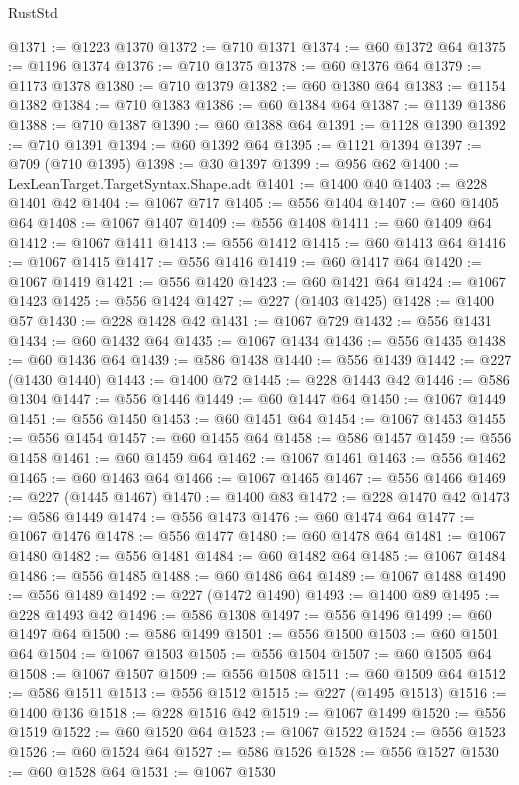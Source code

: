 \begin{lexlean}{RustStd}
\begin{coremodule}
@1371 := @1223 @1370
@1372 := @710 @1371
@1374 := @60 @1372 @64
@1375 := @1196 @1374
@1376 := @710 @1375
@1378 := @60 @1376 @64
@1379 := @1173 @1378
@1380 := @710 @1379
@1382 := @60 @1380 @64
@1383 := @1154 @1382
@1384 := @710 @1383
@1386 := @60 @1384 @64
@1387 := @1139 @1386
@1388 := @710 @1387
@1390 := @60 @1388 @64
@1391 := @1128 @1390
@1392 := @710 @1391
@1394 := @60 @1392 @64
@1395 := @1121 @1394
@1397 := @709 (@710 @1395)
@1398 := @30 @1397
@1399 := @956 @62
@1400 := LexLeanTarget.TargetSyntax.Shape.adt
@1401 := @1400 @40
@1403 := @228 @1401 @42
@1404 := @1067 @717
@1405 := @556 @1404
@1407 := @60 @1405 @64
@1408 := @1067 @1407
@1409 := @556 @1408
@1411 := @60 @1409 @64
@1412 := @1067 @1411
@1413 := @556 @1412
@1415 := @60 @1413 @64
@1416 := @1067 @1415
@1417 := @556 @1416
@1419 := @60 @1417 @64
@1420 := @1067 @1419
@1421 := @556 @1420
@1423 := @60 @1421 @64
@1424 := @1067 @1423
@1425 := @556 @1424
@1427 := @227 (@1403 @1425)
@1428 := @1400 @57
@1430 := @228 @1428 @42
@1431 := @1067 @729
@1432 := @556 @1431
@1434 := @60 @1432 @64
@1435 := @1067 @1434
@1436 := @556 @1435
@1438 := @60 @1436 @64
@1439 := @586 @1438
@1440 := @556 @1439
@1442 := @227 (@1430 @1440)
@1443 := @1400 @72
@1445 := @228 @1443 @42
@1446 := @586 @1304
@1447 := @556 @1446
@1449 := @60 @1447 @64
@1450 := @1067 @1449
@1451 := @556 @1450
@1453 := @60 @1451 @64
@1454 := @1067 @1453
@1455 := @556 @1454
@1457 := @60 @1455 @64
@1458 := @586 @1457
@1459 := @556 @1458
@1461 := @60 @1459 @64
@1462 := @1067 @1461
@1463 := @556 @1462
@1465 := @60 @1463 @64
@1466 := @1067 @1465
@1467 := @556 @1466
@1469 := @227 (@1445 @1467)
@1470 := @1400 @83
@1472 := @228 @1470 @42
@1473 := @586 @1449
@1474 := @556 @1473
@1476 := @60 @1474 @64
@1477 := @1067 @1476
@1478 := @556 @1477
@1480 := @60 @1478 @64
@1481 := @1067 @1480
@1482 := @556 @1481
@1484 := @60 @1482 @64
@1485 := @1067 @1484
@1486 := @556 @1485
@1488 := @60 @1486 @64
@1489 := @1067 @1488
@1490 := @556 @1489
@1492 := @227 (@1472 @1490)
@1493 := @1400 @89
@1495 := @228 @1493 @42
@1496 := @586 @1308
@1497 := @556 @1496
@1499 := @60 @1497 @64
@1500 := @586 @1499
@1501 := @556 @1500
@1503 := @60 @1501 @64
@1504 := @1067 @1503
@1505 := @556 @1504
@1507 := @60 @1505 @64
@1508 := @1067 @1507
@1509 := @556 @1508
@1511 := @60 @1509 @64
@1512 := @586 @1511
@1513 := @556 @1512
@1515 := @227 (@1495 @1513)
@1516 := @1400 @136
@1518 := @228 @1516 @42
@1519 := @1067 @1499
@1520 := @556 @1519
@1522 := @60 @1520 @64
@1523 := @1067 @1522
@1524 := @556 @1523
@1526 := @60 @1524 @64
@1527 := @586 @1526
@1528 := @556 @1527
@1530 := @60 @1528 @64
@1531 := @1067 @1530

\end{coremodule}
\end{lexlean}
